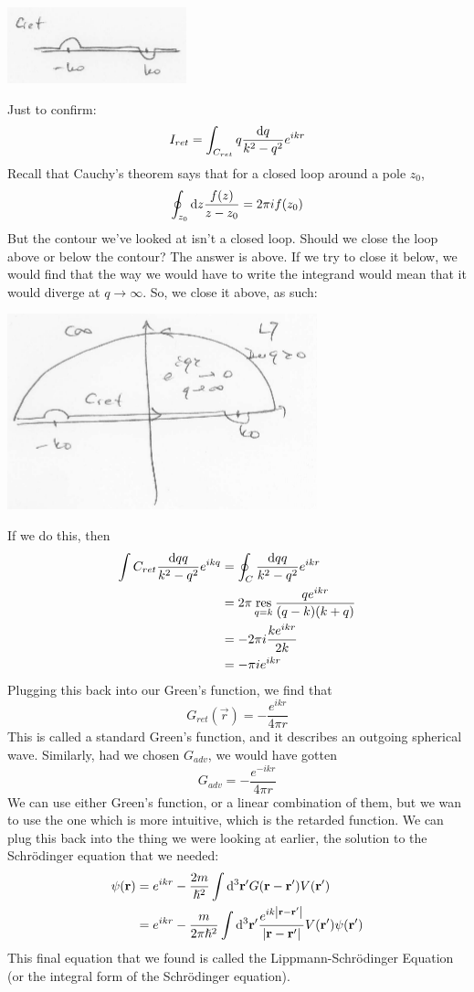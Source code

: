 \documentclass[a4paper]{article}
\begin{document}
\begin{center}
	\includegraphics{ret.png}
\end{center}
Just to confirm:
\[
	I_{ret} = \int_{C_{ret}}q\frac{\mathrm{d} q}{k^2-q^2}e^{ikr}
\]
Recall that Cauchy's theorem says that for a closed loop around a pole $z_0$,
\[
	\oint_{z_0}\mathrm{d} z \frac{f(z)}{z-z_0} = 2\pi i f(z_0)
\]
But the contour we've looked at isn't a closed loop. Should we close the loop
above or below the contour? The answer is above. If we try to close it below,
we would find that the way we would have to write the integrand would mean that
it would diverge at $q\to\infty$. So, we close it above, as such:
\begin{center}
	\includegraphics{close_above.png}
\end{center}
If we do this, then
\begin{align*}
	\int{C_{ret}}\frac{\mathrm{d} q q}{k^2-q^2}e^{ikq} &=
	\oint_{C}\frac{\mathrm{d} q q}{k^2-q^2}e^{ikr}\\
	&= 2\pi \operatorname*{res}_{q=k} \frac{q e^{ikr}}{(q-k)(k+q)}\\
	&= -2\pi i\frac{ke^{ikr}}{2k}\\
	&= -\pi i e^{ikr}
\end{align*}
Plugging this back into our Green's function, we find that
\[
	G_{ret}(\vec{r}) = -\frac{e^{ikr}}{4\pi r}
\]
This is called a standard Green's function, and it describes an outgoing
spherical wave.
Similarly, had we chosen $G_{adv}$, we would have gotten
\[
	G_{adv} = -\frac{e^{-ikr}}{4\pi r}
\]
We can use either Green's function, or a linear combination of them, but we wan
to use the one which is more intuitive, which is the retarded function.
We can plug this back into the thing we were looking at earlier, the solution
to the Schr\"odinger equation that we needed:
\begin{align*}
	\psi(\boldsymbol{\mathbf{r}}) &= e^{ikr} - \frac{2m}{\hslash^2}\int\mathrm{d}^3\boldsymbol{\mathbf{r}}'
	G(\boldsymbol{\mathbf{r}}-\boldsymbol{\mathbf{r}}')V(\boldsymbol{\mathbf{r}}')\\
	&= e^{ikr} - \frac{m}{2\pi\hslash^2}\int\mathrm{d}^3\boldsymbol{\mathbf{r}}'
	\frac{e^{ik\left\lvert \boldsymbol{\mathbf{r}}-\boldsymbol{\mathbf{r}}'\right\rvert}}{\left\lvert \boldsymbol{\mathbf{r}}-\boldsymbol{\mathbf{r}}'\right\rvert} V(\boldsymbol{\mathbf{r}}')
	\psi(\boldsymbol{\mathbf{r}}')
\end{align*}
This final equation that we found is called the Lippmann-Schr\"odinger Equation
(or the integral form of the Schr\"odinger equation).
\end{document}
